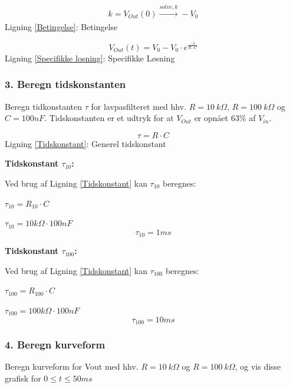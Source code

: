 \begin{center}
\begin{equation}
k=V_{Out}(0) \xrightarrow[ ]{solve,k}-V_{0}
\label{Betingelse} 
\end{equation}
Ligning \ref{Betingelse}: Betingelse
\end{center}

\begin{center}
\begin{equation}
V_{Out}(t)=V_{0}-V_{0} \cdot e^{\frac{-t}{R \cdot C}}
\label{Specifikke losning}
\end{equation}
Ligning \ref{Specifikke losning}: Specifikke Løsning
\end{center}

 
\subsubsection*{3. Beregn tidskonstanten}
Beregn tidkonstanten $\tau$
 for lavpasfilteret med hhv. $R= 10\ k\Omega$, $R= 100\ k\Omega$ og $C=100nF$. Tidskonstanten er et udtryk for at $V_{Out}$ er opnået 63\% af $V_{in}$.
\begin{center}
\begin{equation}
\tau = R \cdot C
\label{Tidskonstant}
\end{equation}
Ligning \ref{Tidskonstant}: Generel tidskonstant
\end{center} 

 
\textbf{Tidskonstant $\tau_{10}$:}

Ved brug af Ligning \ref{Tidskonstant} kan $\tau_{10}$ beregnes:
\begin{center}
$\tau_{10}=R_{10}\cdot C$

$\tau_{10}= 10 k\Omega \cdot 100nF$
\begin{equation}
\tau_{10}= 1ms
\label{tau_10}
\end{equation}
\end{center}


\textbf{Tidskonstant $\tau_{100}$:}


Ved brug af Ligning \ref{Tidskonstant} kan $\tau_{100}$ beregnes:
\begin{center}
$\tau_{100}=R_{100}\cdot C$

$\tau_{100}= 100 k\Omega \cdot 100nF$
\begin{equation}
\tau_{100}=10ms
\label{tau_100}
\end{equation}
\end{center}


\subsubsection*{4. Beregn kurveform}
Beregn kurveform for Vout med hhv.  $R= 10\ k\Omega$ og $R= 100\ k\Omega$, 
og vis disse grafisk for $0 \leq t \leq 50 ms$ 

